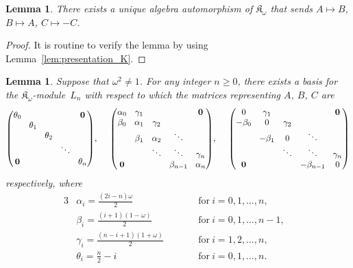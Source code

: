 \documentclass[pdftex]{sigma}%
\def\K{\mathfrak K_\omega}
\numberwithin{equation}{section}
\newtheorem{Lemma}[Theorem]{Lemma}
\begin{document}
\begin{Lemma}\label{lem:auto_K}
There exists a unique algebra automorphism of $\K$ that sends
$A \mapsto B$, $B \mapsto A$, $C \mapsto -C$.
\end{Lemma}

\begin{proof}
It is routine to verify the lemma by using Lemma~\ref{lem:presentation_K}.
\end{proof}

\begin{Lemma}\label{lem2:Vn_K}
Suppose that $\omega^2\not=1$. For any integer $n\geq 0$,
there exists a basis for the $\K$-mod\-ule~$L_n$ with respect to which
the matrices representing $A$, $B$, $C$ are
\begin{gather*}%
\setlength{\arraycolsep}{4.5pt}
\begin{pmatrix}
\theta_0 & & & &{\bf 0}
\\
 &\theta_1
\\
 & &\theta_2
 \\
 & & &\ddots
 \\
{\bf 0} & & & &\theta_n
\end{pmatrix}\!,
\quad\
\begin{pmatrix}
\alpha_0 &\gamma_1 & & &{\bf 0}
\\
\beta_0 &\alpha_1 &\gamma_2
\\
&\beta_1 &\alpha_2 &\ddots
 \\
& &\ddots &\ddots &\gamma_n
 \\
{\bf 0} & & &\beta_{n-1} &\alpha_n
\end{pmatrix}\!,
\quad\
\begin{pmatrix}
0 &\gamma_1 & & &{\bf 0}
\\
-\beta_0 &0 &\gamma_2
\\
&-\beta_1 &0 &\ddots
 \\
& &\ddots &\ddots &\gamma_n
 \\
{\bf 0} & & &-\beta_{n-1} &0
\end{pmatrix}
\end{gather*}
respectively, where
\begin{alignat*}{3}
&\alpha_i=\frac{(2i-n)\omega}{2}\qquad
&&\text{for} \ i=0,1,\dots,n,&
\\
&\beta_i=\frac{(i+1)(1-\omega)}{2}\qquad
&&\text{for} \ i=0,1,\dots,n-1,&
\\
&\gamma_i=\frac{(n-i+1)(1+\omega)}{2}\qquad
&&\text{for} \ i=1,2,\dots,n,&
\\
&\theta_i=\frac{n}{2}-i
\qquad&&\text{for} \ i=0,1,\dots,n.&
\end{alignat*}
\end{Lemma}
\end{document}
